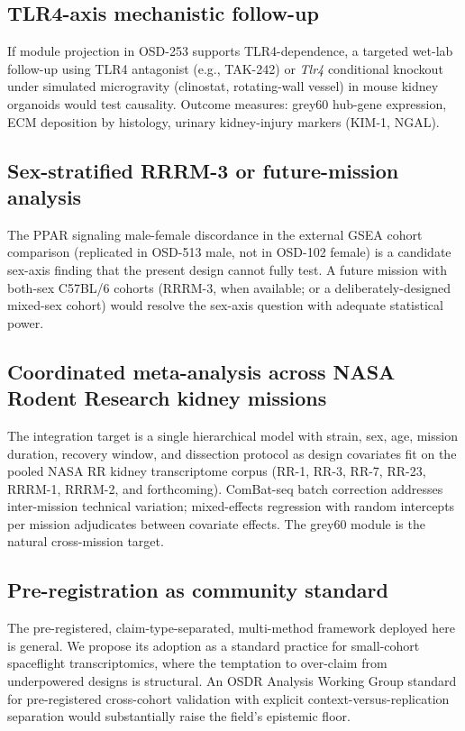 \documentclass[11pt]{article}
\newcommand{\gene}[1]{\textit{#1}}
\begin{document}
\subsection{TLR4-axis mechanistic follow-up}

If module projection in OSD-253 supports TLR4-dependence, a targeted wet-lab follow-up using TLR4 antagonist (e.g., TAK-242) or \gene{Tlr4} conditional knockout under simulated microgravity (clinostat, rotating-wall vessel) in mouse kidney organoids \citep{morizane2015nephron} would test causality. Outcome measures: grey60 hub-gene expression, ECM deposition by histology, urinary kidney-injury markers (KIM-1, NGAL).

\subsection{Sex-stratified RRRM-3 or future-mission analysis}

The PPAR signaling male-female discordance in the external GSEA cohort comparison (replicated in OSD-513 male, not in OSD-102 female) is a candidate sex-axis finding that the present design cannot fully test. A future mission with both-sex C57BL/6 cohorts (RRRM-3, when available; or a deliberately-designed mixed-sex cohort) would resolve the sex-axis question with adequate statistical power.

\subsection{Coordinated meta-analysis across NASA Rodent Research kidney missions}

The integration target is a single hierarchical model with strain, sex, age, mission duration, recovery window, and dissection protocol as design covariates fit on the pooled NASA RR kidney transcriptome corpus (RR-1, RR-3, RR-7, RR-23, RRRM-1, RRRM-2, and forthcoming). ComBat-seq batch correction \citep{zhang2020combat} addresses inter-mission technical variation; mixed-effects regression with random intercepts per mission adjudicates between covariate effects. The grey60 module is the natural cross-mission target.

\subsection{Pre-registration as community standard}

The pre-registered, claim-type-separated, multi-method framework deployed here is general. We propose its adoption as a standard practice for small-cohort spaceflight transcriptomics, where the temptation to over-claim from underpowered designs is structural. An OSDR Analysis Working Group standard for pre-registered cross-cohort validation with explicit context-versus-replication separation would substantially raise the field's epistemic floor.
\end{document}
